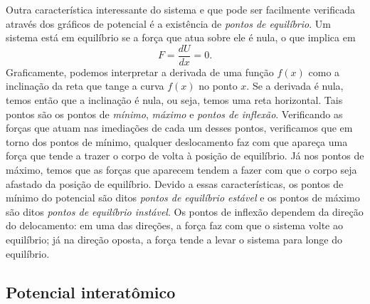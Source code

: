 Outra característica interessante do sistema e que pode ser facilmente verificada através dos gráficos de potencial é a existência de \emph{pontos de equilíbrio}. Um sistema está em equilíbrio se a força que atua sobre ele é nula, o que implica em
\begin{equation}
  F = \frac{dU}{dx} = 0.
\end{equation}
%
Graficamente, podemos interpretar a derivada de uma função $f(x)$ como a inclinação da reta que tange a curva $f(x)$ no ponto $x$. Se a derivada é nula, temos então que a inclinação é nula, ou seja, temos uma reta horizontal. Tais pontos são os pontos de \emph{mínimo}, \emph{máximo} e \emph{pontos de inflexão}. Verificando as forças que atuam nas imediações de cada um desses pontos, verificamos que em torno dos pontos de mínimo, qualquer deslocamento faz com que apareça uma força que tende a trazer o corpo de volta à posição de equilíbrio. Já nos pontos de máximo, temos que as forças que aparecem tendem a fazer com que o corpo seja afastado da posição de equilíbrio. Devido a essas características, os pontos de mínimo do potencial são ditos \emph{pontos de equilíbrio estável} e os pontos de máximo são ditos \emph{pontos de equilíbrio instável}. Os pontos de inflexão dependem da direção do delocamento: em uma das direções, a força faz com que o sistema volte ao equilíbrio; já na direção oposta, a força tende a levar o sistema para longe do equilíbrio.

\subsection{Potencial interatômico}

